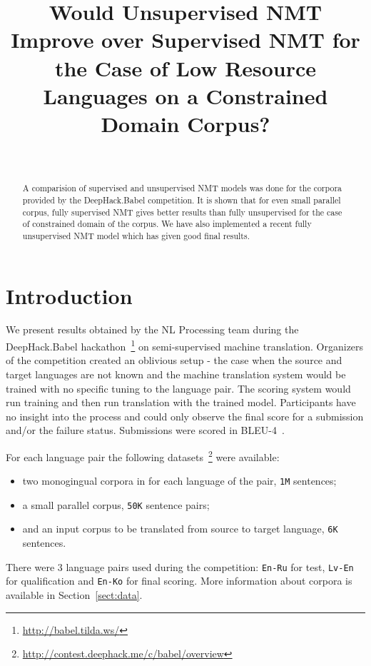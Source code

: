 \documentclass[]{article}
\begin{document}
\title{\bf Would Unsupervised NMT Improve over Supervised NMT for the Case of Low Resource Languages on a Constrained Domain Corpus?}
\author{ \hfill  {}\\
\AND
         \hfill {}
}

\maketitle
\pagestyle{empty}

\begin{abstract}
  A comparision of supervised and unsupervised NMT models was done for the corpora provided by the DeepHack.Babel competition.
  It is shown that for even small parallel corpus, fully supervised NMT gives better results than fully unsupervised for the case of constrained domain of the corpus.
  We have also implemented a recent fully unsupervised NMT model which has given good final results.
\end{abstract}

\section{Introduction}
\label{sect:intro}

We present results obtained by the NL Processing team during the DeepHack.Babel hackathon~\footnote{\url{http://babel.tilda.ws/}} on semi-supervised machine translation.
Organizers of the competition created an oblivious setup - the case when the source and target languages are not known and the machine translation system would be trained with no specific tuning to the language pair.
The scoring system would run training and then run translation with the trained model.
Participants have no insight into the process and could only observe the final score for a submission and/or the failure status.
Submissions were scored in BLEU-4~\citep{papineni2002bleu}.

For each language pair the following datasets~\footnote{\url{http://contest.deephack.me/c/babel/overview}} were available:
\begin{itemize}
  \item two monogingual corpora in for each language of the pair, {\tt 1M} sentences;
  \item a small parallel corpus, {\tt 50K} sentence pairs;
  \item and an input corpus to be translated from source to target language, {\tt 6K} sentences.
\end{itemize}
There were 3 language pairs used during the competition: {\tt En-Ru} for test, {\tt Lv-En} for qualification and {\tt En-Ko} for final scoring.
More information about corpora is available in Section~\ref{sect:data}.
\end{document}
